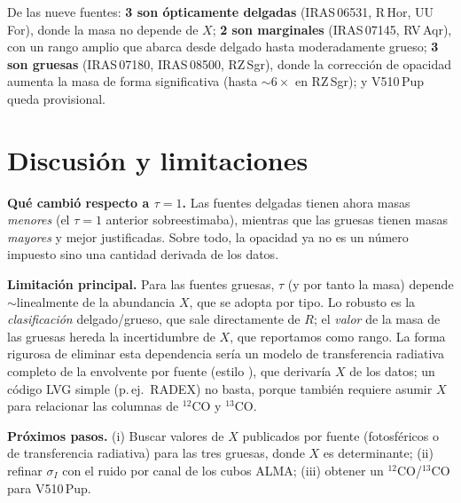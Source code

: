 \documentclass[12pt, a4paper]{article}
\begin{document}
\noindent De las nueve fuentes: \textbf{3 son ópticamente delgadas} (IRAS\,06531, R\,Hor,
UU\,For), donde la masa no depende de $X$; \textbf{2 son marginales} (IRAS\,07145, RV\,Aqr),
con un rango amplio que abarca desde delgado hasta moderadamente grueso; \textbf{3 son gruesas}
(IRAS\,07180, IRAS\,08500, RZ\,Sgr), donde la corrección de opacidad aumenta la masa de forma
significativa (hasta $\sim6\times$ en RZ\,Sgr); y V510\,Pup queda provisional.

\section{Discusión y limitaciones}

\textbf{Qué cambió respecto a $\tau=1$.} Las fuentes delgadas tienen ahora masas \emph{menores}
(el $\tau=1$ anterior sobreestimaba), mientras que las gruesas tienen masas \emph{mayores} y
mejor justificadas. Sobre todo, la opacidad ya no es un número impuesto sino una cantidad
derivada de los datos.

\textbf{Limitación principal.} Para las fuentes gruesas, $\tau$ (y por tanto la masa) depende
$\sim$linealmente de la abundancia $X$, que se adopta por tipo. Lo robusto es la
\emph{clasificación} delgado/grueso, que sale directamente de $R$; el \emph{valor} de la masa
de las gruesas hereda la incertidumbre de $X$, que reportamos como rango. La forma rigurosa de
eliminar esta dependencia sería un modelo de transferencia radiativa completo de la envolvente
por fuente (estilo \citealp{ramstedt2014}), que derivaría $X$ de los datos; un código LVG
simple (p.\,ej.\ RADEX) no basta, porque también requiere asumir $X$ para relacionar las
columnas de $^{12}$CO y $^{13}$CO.

\textbf{Próximos pasos.} (i) Buscar valores de $X$ publicados por fuente (fotosféricos o de
transferencia radiativa) para las tres gruesas, donde $X$ es determinante; (ii) refinar
$\sigma_I$ con el ruido por canal de los cubos ALMA; (iii) obtener un $^{12}$CO/$^{13}$CO para
V510\,Pup.
\end{document}
